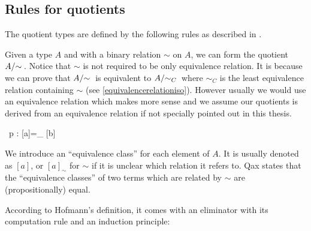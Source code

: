 




\subsection{Rules for quotients}\label{iqs}

The quotient types are defined by the following rules as described in \cite{Jacobs94quotientsin,hof:95:sm}. 


{\Gamma \vdash {}}

Given a type $A$ and with a binary relation $\sim$ on $A$, we can form the quotient $\qset{A}$.
Notice that $\sim$ is not required to be only equivalence relation. It is because we can prove that $\qset{A}$ is equivalent to $\qsetc{A}$ where $\sim_{C}$ is the least equivalence relation containing $\sim$ (see \autoref{equivalencerelationiso}). However usually we would use an equivalence relation which makes more sense and we assume our quotients is derived from an equivalence relation if not specially pointed out in this thesis.


\begin{multicols}{2}
\columnbreak
{}
{ \Gamma \vdash {} ~p : [a]=_{} [b]}
\end{multicols}


We introduce an ``equivalence class'' for each element of $A$. It is usually denoted as $[ a ]$, or $[ a ]_{\sim}$ for $\sim$ if it is unclear which relation it refers to. Qax states that the ``equivalence classes'' of two terms which are related by $\sim$ are (propositionally) equal.


According to Hofmann's \cite{hof:95:sm} definition, it comes with an eliminator with its computation rule and an induction principle:


